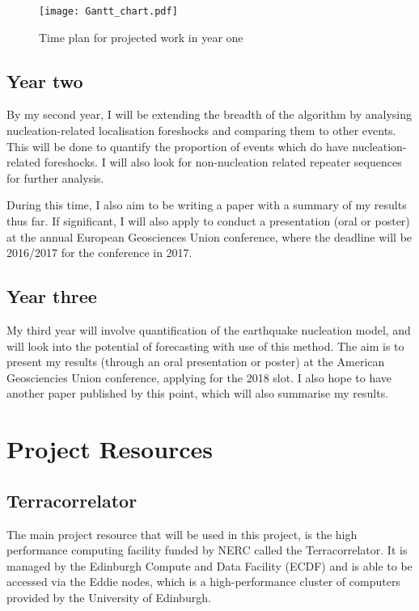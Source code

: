 \documentclass[12pt]{report}
\begin{document}
\begin{landscape}
	\begin{figure}[h!]
		\begin{center}
		\texttt{[image: Gantt\_chart.pdf]}
		\caption[Gantt chart]{Time plan for projected work in year one}
		\label{Gantt}
		\end{center}
	\end{figure}
\end{landscape}

\section{Year two}
By my second year, I will be extending the breadth of the algorithm by analysing nucleation-related localisation foreshocks and comparing them to other events. This will be done to quantify the proportion of events which do have nucleation-related foreshocks. I will also look for non-nucleation related repeater sequences for further analysis. 

During this time, I also aim to be writing a paper with a summary of my results thus far. If significant, I will also apply to conduct a presentation (oral or poster) at the annual European Geosciences Union conference, where the deadline will be 2016/2017 for the conference in 2017.

\section{Year three}
My third year will involve quantification of the earthquake nucleation model, and will look into the potential of forecasting with use of this method. The aim is to present my results (through an oral presentation or poster) at the American Geosciencies Union conference, applying for the 2018 slot. I also hope to have another paper published by this point, which will also summarise my results. 

\chapter{Project Resources}
\section{Terracorrelator}
The main project resource that will be used in this project, is the high performance computing facility funded by NERC called the Terracorrelator. It is managed by the Edinburgh Compute and Data Facility (ECDF) and is able to be accessed via the Eddie nodes, which is a high-performance cluster of computers provided by the University of Edinburgh.
\end{document}
